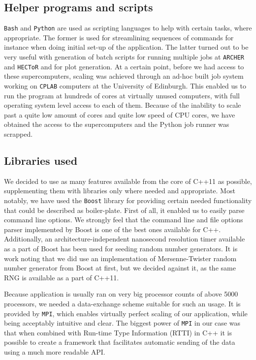 \documentclass[11pt,a4paper]{article}
\begin{document}
\begin{appendices}
    \subsection{Helper programs and scripts}
    \texttt{Bash} and \texttt{Python} are used as scripting languages to help with certain tasks, where appropriate.
    The former is used for streamlining sequences of commands for instance when doing initial set-up of the application.
    The latter turned out to be very useful with generation of batch scripts for running multiple jobs at \texttt{ARCHER} and \texttt{HECToR} and for plot generation.
    At a certain point, before we had access to these supercomputers, scaling was achieved through an ad-hoc built job system working on \texttt{CPLAB} computers at the University of Edinburgh.
    This enabled us to run the program at hundreds of cores at virtually unused computers, with full operating system level access to each of them.
    Because of the inability to scale past a quite low amount of cores and quite low speed of CPU cores, we have obtained the access to the supercomputers and the Python job runner was scrapped.

    \subsection{Libraries used}
    We decided to use as many features available from the core of C++11 as possible, supplementing them with libraries only where needed and appropriate.
    Most notably, we have used the \texttt{Boost}\cite{gurtovoy02} library for providing certain needed functionality that could be described as boiler-plate.
    First of all, it enabled us to easily parse command line options.
    We strongly feel that the command line and file options parser implemented by Boost is one of the best ones available for C++.
    Additionally, an architecture-independent nanosecond resolution timer available as a part of Boost has been used for seeding random number generators.
    It is work noting that we did use an implementation of Mersenne-Twister\cite{Matsumoto98} random number generator from Boost at first, but we decided against it, as the same RNG is available as a part of C++11.

    Because application is usually ran on very big processor counts of above 5000 processors, we needed a data-exchange scheme suitable for such an usage.
    It is provided by \texttt{MPI}\cite{richard06}, which enables virtually perfect scaling of our application, while being acceptably intuitive and clear.
    The biggest power of \texttt{MPI} in our case was that when combined with Run-time Type Information (RTTI) in C++ it is possible to create a framework that facilitates automatic sending of the data using a much more readable API.


\end{appendices}
\end{document}

